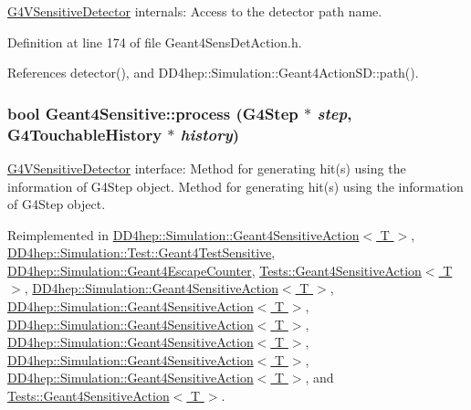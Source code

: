 \hyperlink{class_g4_v_sensitive_detector}{G4VSensitiveDetector} internals: Access to the detector path name. 

Definition at line 174 of file Geant4SensDetAction.h.

References detector(), and DD4hep::Simulation::Geant4ActionSD::path().\hypertarget{class_d_d4hep_1_1_simulation_1_1_geant4_sensitive_a9a9463a6c29a66dad43a52ffc9f7838d}{
\subsubsection[{process}]{\setlength{\rightskip}{0pt plus 5cm}bool Geant4Sensitive::process (G4Step $\ast$ {\em step}, \/  G4TouchableHistory $\ast$ {\em history})}}
\label{class_d_d4hep_1_1_simulation_1_1_geant4_sensitive_a9a9463a6c29a66dad43a52ffc9f7838d}


\hyperlink{class_g4_v_sensitive_detector}{G4VSensitiveDetector} interface: Method for generating hit(s) using the information of G4Step object. Method for generating hit(s) using the information of G4Step object. 

Reimplemented in \hyperlink{class_d_d4hep_1_1_simulation_1_1_geant4_sensitive_action_a36759982ed0876a5ce81c14973c18077}{DD4hep::Simulation::Geant4SensitiveAction$<$ T $>$}, \hyperlink{class_d_d4hep_1_1_simulation_1_1_test_1_1_geant4_test_sensitive_aa5d824cbc3f5bfdd8e03236c8aec07ed}{DD4hep::Simulation::Test::Geant4TestSensitive}, \hyperlink{class_d_d4hep_1_1_simulation_1_1_geant4_escape_counter_a869bbe150025b9798af6ab7487d225de}{DD4hep::Simulation::Geant4EscapeCounter}, \hyperlink{class_tests_1_1_geant4_sensitive_action_a6ae919f9aeb71219a38300d3918ed814}{Tests::Geant4SensitiveAction$<$ T $>$}, \hyperlink{class_d_d4hep_1_1_simulation_1_1_geant4_sensitive_action_a126f9c3d065be1608935c5e16149cec3}{DD4hep::Simulation::Geant4SensitiveAction$<$ T $>$}, \hyperlink{class_d_d4hep_1_1_simulation_1_1_geant4_sensitive_action_aca71f1e67794a93cd1682101b5c110f9}{DD4hep::Simulation::Geant4SensitiveAction$<$ T $>$}, \hyperlink{class_d_d4hep_1_1_simulation_1_1_geant4_sensitive_action_a085a617b35c067ca4b29ba4093d976d6}{DD4hep::Simulation::Geant4SensitiveAction$<$ T $>$}, \hyperlink{class_d_d4hep_1_1_simulation_1_1_geant4_sensitive_action_a1828a968de6f07ff11e5b53f23593c3c}{DD4hep::Simulation::Geant4SensitiveAction$<$ T $>$}, \hyperlink{class_d_d4hep_1_1_simulation_1_1_geant4_sensitive_action_a66fa5dd6c3ea881689b16f73e9c7887b}{DD4hep::Simulation::Geant4SensitiveAction$<$ T $>$}, \hyperlink{class_d_d4hep_1_1_simulation_1_1_geant4_sensitive_action_a97df218d3791d86a41d0ad52a780e87e}{DD4hep::Simulation::Geant4SensitiveAction$<$ T $>$}, and \hyperlink{class_tests_1_1_geant4_sensitive_action_acd1c0fc85d8ade97401c76f14bf2b32b}{Tests::Geant4SensitiveAction$<$ T $>$}.

